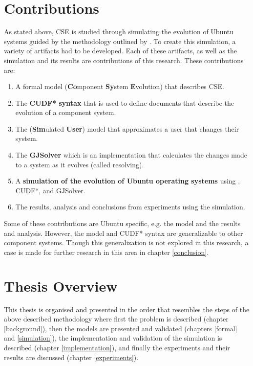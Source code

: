 \section{Contributions}
As stated above, CSE is studied through simulating the evolution of Ubuntu systems guided by the methodology outlined by \cite{Law2005}.
To create this simulation, a variety of artifacts had to be developed.
Each of these artifacts, as well as the simulation and its results are contributions of this research. 
These contributions are:
\begin{enumerate}
  \item A formal model \textbf{\modelname} (\textbf{Co}mponent \textbf{Sy}stem \textbf{E}volution) that describes CSE. 
  \item The \textbf{CUDF* syntax} that is used to define documents that describe the evolution of a component system.
  \item The \textbf{\usermodel} (\textbf{Sim}ulated \textbf{User}) model that approximates a user that changes their system.
  \item The \textbf{GJSolver} which is an implementation that calculates the changes made to a system as it evolves (called resolving).
  \item A \textbf{simulation of the evolution of Ubuntu operating systems} using \modelname, CUDF*, \usermodel and GJSolver.
  \item The results, analysis and conclusions from experiments using the simulation.
\end{enumerate}

Some of these contributions are Ubuntu specific, e.g. the \usermodel model and the results and analysis.
However, the \modelname model and CUDF* syntax are generalizable to other component systems.
Though this generalization is not explored in this research, a case is made for further research in this area in chapter \ref{conclusion}.

\section{Thesis Overview}
This thesis is organised and presented in the order that resembles the steps of the above described methodology
where first the problem is described (chapter \ref{background}), then the models are presented and validated (chapters \ref{formal} and \ref{simulation}),
the implementation and validation of the simulation is described (chapter \ref{implementation}), and finally the experiments and their results are discussed (chapter \ref{experiments}).  

